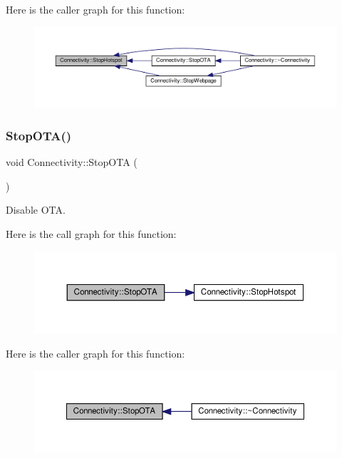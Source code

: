 Here is the caller graph for this function\+:
\nopagebreak
\begin{figure}[H]
\begin{center}
\leavevmode
\includegraphics[width=350pt]{classConnectivity_aaa9ca6a4b59d47cd1135101af1056a22_icgraph}
\end{center}
\end{figure}
\mbox{\label{classConnectivity_aa99aeadd725a7cd8edc7255775955807}} 
\subsubsection{\texorpdfstring{Stop\+O\+T\+A()}{StopOTA()}}
{\footnotesize\ttfamily void Connectivity\+::\+Stop\+O\+TA (\begin{DoxyParamCaption}{ }\end{DoxyParamCaption})}



Disable O\+TA. 

Here is the call graph for this function\+:
\nopagebreak
\begin{figure}[H]
\begin{center}
\leavevmode
\includegraphics[width=350pt]{classConnectivity_aa99aeadd725a7cd8edc7255775955807_cgraph}
\end{center}
\end{figure}
Here is the caller graph for this function\+:
\nopagebreak
\begin{figure}[H]
\begin{center}
\leavevmode
\includegraphics[width=350pt]{classConnectivity_aa99aeadd725a7cd8edc7255775955807_icgraph}
\end{center}
\end{figure}
\mbox{\label{classConnectivity_a5a123ddd0c4ab4061d1fa564fe3e7490}} 
